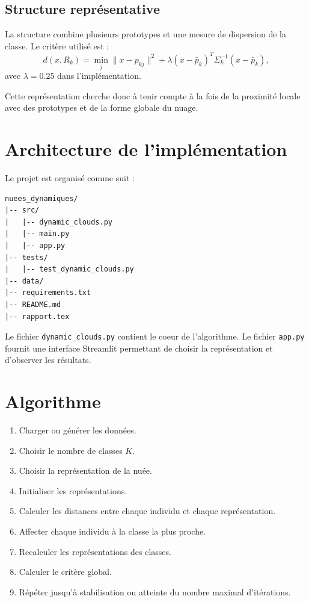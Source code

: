 \documentclass[12pt,a4paper]{article}
\begin{document}
\subsection{Structure représentative}

La structure combine plusieurs prototypes et une mesure de dispersion de la classe. Le critère utilisé est :
\[
d(x,R_k)=\min_j\|x-p_{kj}\|^2+
\lambda(x-\bar p_k)^T\Sigma_k^{-1}(x-\bar p_k),
\]
avec $\lambda=0.25$ dans l'implémentation.

Cette représentation cherche donc à tenir compte à la fois de la proximité locale avec des prototypes et de la forme globale du nuage.

\section{Architecture de l'implémentation}

Le projet est organisé comme suit :

\begin{verbatim}
nuees_dynamiques/
|-- src/
|   |-- dynamic_clouds.py
|   |-- main.py
|   |-- app.py
|-- tests/
|   |-- test_dynamic_clouds.py
|-- data/
|-- requirements.txt
|-- README.md
|-- rapport.tex
\end{verbatim}

Le fichier \texttt{dynamic\_clouds.py} contient le coeur de l'algorithme. Le fichier \texttt{app.py} fournit une interface Streamlit permettant de choisir la représentation et d'observer les résultats.

\section{Algorithme}

\begin{enumerate}
    \item Charger ou générer les données.
    \item Choisir le nombre de classes $K$.
    \item Choisir la représentation de la nuée.
    \item Initialiser les représentations.
    \item Calculer les distances entre chaque individu et chaque représentation.
    \item Affecter chaque individu à la classe la plus proche.
    \item Recalculer les représentations des classes.
    \item Calculer le critère global.
    \item Répéter jusqu'à stabilisation ou atteinte du nombre maximal d'itérations.
\end{enumerate}
\end{document}
